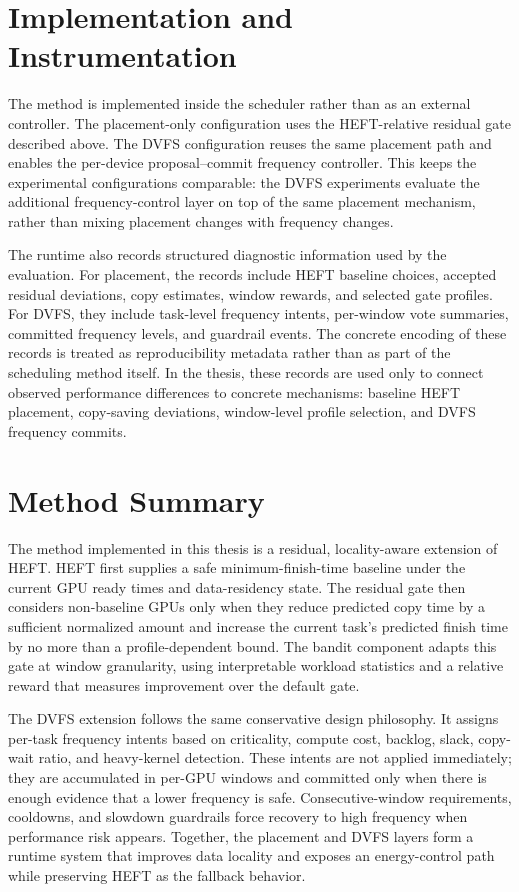 \section{Implementation and Instrumentation}
\label{sec:methods-implementation-instrumentation}

The method is implemented inside the \CUDASTF{} scheduler rather than as an external controller. The placement-only configuration uses the HEFT-relative residual gate described above. The DVFS configuration reuses the same placement path and enables the per-device proposal--commit frequency controller. This keeps the experimental configurations comparable: the DVFS experiments evaluate the additional frequency-control layer on top of the same placement mechanism, rather than mixing placement changes with frequency changes.

The runtime also records structured diagnostic information used by the evaluation. For placement, the records include HEFT baseline choices, accepted residual deviations, copy estimates, window rewards, and selected gate profiles. For DVFS, they include task-level frequency intents, per-window vote summaries, committed frequency levels, and guardrail events. The concrete encoding of these records is treated as reproducibility metadata rather than as part of the scheduling method itself. In the thesis, these records are used only to connect observed performance differences to concrete mechanisms: baseline HEFT placement, copy-saving deviations, window-level profile selection, and DVFS frequency commits.

\section{Method Summary}
\label{sec:methods-summary}

The method implemented in this thesis is a residual, locality-aware extension of HEFT. HEFT first supplies a safe minimum-finish-time baseline under the current GPU ready times and data-residency state. The residual gate then considers non-baseline GPUs only when they reduce predicted copy time by a sufficient normalized amount and increase the current task's predicted finish time by no more than a profile-dependent bound. The bandit component adapts this gate at window granularity, using interpretable workload statistics and a relative reward that measures improvement over the default gate.

The DVFS extension follows the same conservative design philosophy. It assigns per-task frequency intents based on criticality, compute cost, backlog, slack, copy-wait ratio, and heavy-kernel detection. These intents are not applied immediately; they are accumulated in per-GPU windows and committed only when there is enough evidence that a lower frequency is safe. Consecutive-window requirements, cooldowns, and slowdown guardrails force recovery to high frequency when performance risk appears. Together, the placement and DVFS layers form a runtime system that improves data locality and exposes an energy-control path while preserving HEFT as the fallback behavior.
